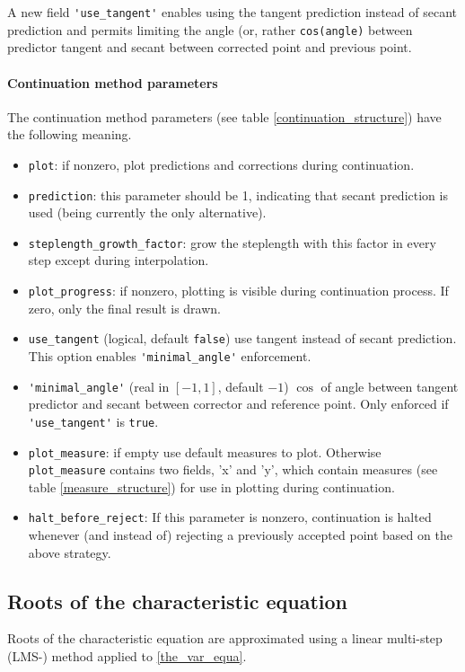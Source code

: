 \documentclass[10pt]{scrartcl}
\newcommand{\blist}[1]{\mbox{\lstinline!#1!}}
\begin{document}
{A new field \blist{'use_tangent'} enables using the tangent prediction
instead of secant prediction and permits limiting the angle (or,
rather \blist{cos(angle)} between predictor tangent and secant between
corrected point and previous point.
\paragraph{Continuation method parameters}
The continuation method parameters (see table \ref{continuation_structure})
have the following meaning.
\begin{itemize}
\item \blist{plot}: if nonzero, plot predictions and corrections
during continuation.
\item \blist{prediction}: this parameter should be 1, indicating
that secant prediction is used (being currently the only
alternative).
\item \blist{steplength_growth_factor}: grow the steplength with
this factor in every step except during interpolation.
\item \blist{plot_progress}: if nonzero, plotting is visible during
  continuation process. If zero, only the final result is drawn.
\item \blist{use_tangent} (logical, default \blist{false}) use tangent
  instead of secant prediction. This option enables
  \blist{'minimal_angle'} enforcement.
\item \blist{'minimal_angle'} (real in $[-1,1]$, default $-1$) $\cos$ of angle
  between tangent predictor and secant between corrector and reference
  point. Only enforced if \blist{'use_tangent'} is \blist{true}.
\item \blist{plot_measure}: if empty use default measures to plot.
  Otherwise \blist{plot_measure} contains two fields, 'x' and 'y',
  which contain measures (see table \ref{measure_structure}) for use
  in plotting during continuation.
\item \blist{halt_before_reject}: If this parameter is nonzero,
continuation is halted whenever (and instead of) rejecting a
previously accepted point based on the above strategy.
\end{itemize}

\subsection{Roots of the characteristic equation}\label{root_char_equa_gio_label}
Roots of the characteristic equation are approximated using a linear
multi-step (LMS-) method applied to \eqref{the_var_equa}.

}
\end{document}
